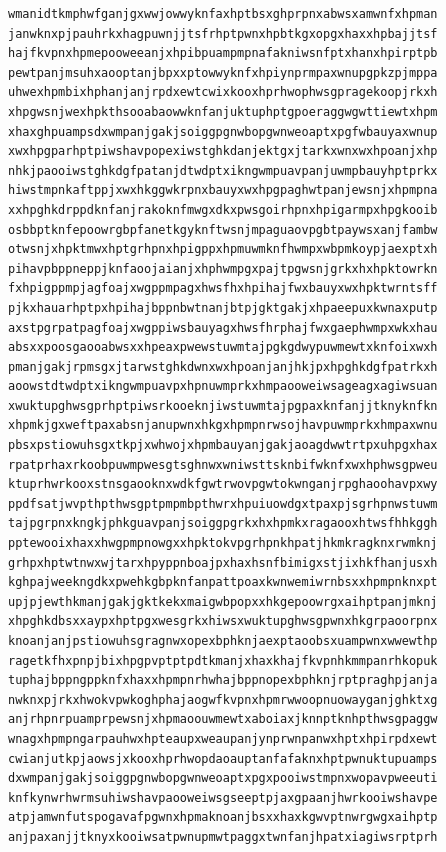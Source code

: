 \documentclass[11pt,letterpaper]{exam}
\begin{document}
\begin{questions}
\begin{verbatim}
wmanidtkmphwfganjgxwwjowwyknfaxhptbsxghprpnxabwsxamwnfxhpman
janwknxpjpauhrkxhagpuwnjjtsfrhptpwnxhpbtkgxopgxhaxxhpbajjtsf
hajfkvpnxhpmepooweeanjxhpibpuampmpnafakniwsnfptxhanxhpirptpb
pewtpanjmsuhxaooptanjbpxxptowwyknfxhpiynprmpaxwnupgpkzpjmppa
uhwexhpmbixhphanjanjrpdxewtcwixkooxhprhwophwsgpragekoopjrkxh
xhpgwsnjwexhpkthsooabaowwknfanjuktuphptgpoeraggwgwttiewtxhpm
xhaxghpuampsdxwmpanjgakjsoiggpgnwbopgwnweoaptxpgfwbauyaxwnup
xwxhpgparhptpiwshavpopexiwstghkdanjektgxjtarkxwnxwxhpoanjxhp
nhkjpaooiwstghkdgfpatanjdtwdptxikngwmpuavpanjuwmpbauyhptprkx
hiwstmpnkaftppjxwxhkggwkrpnxbauyxwxhpgpaghwtpanjewsnjxhpmpna
xxhpghkdrppdknfanjrakoknfmwgxdkxpwsgoirhpnxhpigarmpxhpgkooib
osbbptknfepoowrgbpfanetkgyknftwsnjmpaguaovpgbtpaywsxanjfambw
otwsnjxhpktmwxhptgrhpnxhpigppxhpmuwmknfhwmpxwbpmkoypjaexptxh
pihavpbppneppjknfaoojaianjxhphwmpgxpajtpgwsnjgrkxhxhpktowrkn
fxhpigppmpjagfoajxwgppmpagxhwsfhxhpihajfwxbauyxwxhpktwrntsff
pjkxhauarhptpxhpihajbppnbwtnanjbtpjgktgakjxhpaeepuxkwnaxputp
axstpgrpatpagfoajxwgppiwsbauyagxhwsfhrphajfwxgaephwmpxwkxhau
absxxpoosgaooabwsxxhpeaxpwewstuwmtajpgkgdwypuwmewtxknfoixwxh
pmanjgakjrpmsgxjtarwstghkdwnxwxhpoanjanjhkjpxhpghkdgfpatrkxh
aoowstdtwdptxikngwmpuavpxhpnuwmprkxhmpaooweiwsageagxagiwsuan
xwuktupghwsgprhptpiwsrkooeknjiwstuwmtajpgpaxknfanjjtknyknfkn
xhpmkjgxweftpaxabsnjanupwnxhkgxhpmpnrwsojhavpuwmprkxhmpaxwnu
pbsxpstiowuhsgxtkpjxwhwojxhpmbauyanjgakjaoagdwwtrtpxuhpgxhax
rpatprhaxrkoobpuwmpwesgtsghnwxwniwsttsknbifwknfxwxhphwsgpweu
ktuprhwrkooxstnsgaooknxwdkfgwtrwovpgwtokwnganjrpghaoohavpxwy
ppdfsatjwvpthpthwsgptpmpmbpthwrxhpuiuowdgxtpaxpjsgrhpnwstuwm
tajpgrpnxkngkjphkguavpanjsoiggpgrkxhxhpmkxragaooxhtwsfhhkggh
pptewooixhaxxhwgpmpnowgxxhpktokvpgrhpnkhpatjhkmkragknxrwmknj
grhpxhptwtnwxwjtarxhpyppnboajpxhaxhsnfbimigxstjixhkfhanjusxh
kghpajweekngdkxpwehkgbpknfanpattpoaxkwnwemiwrnbsxxhpmpnknxpt
upjpjewthkmanjgakjgktkekxmaigwbpopxxhkgepoowrgxaihptpanjmknj
xhpghkdbsxxaypxhptpgxwesgrkxhiwsxwuktupghwsgpwnxhkgrpaoorpnx
knoanjanjpstiowuhsgragnwxopexbphknjaexptaoobsxuampwnxwwewthp
ragetkfhxpnpjbixhpgpvptptpdtkmanjxhaxkhajfkvpnhkmmpanrhkopuk
tuphajbppngppknfxhaxxhpmpnrhwhajbppnopexbphknjrptpraghpjanja
nwknxpjrkxhwokvpwkoghphajaogwfkvpnxhpmrwwoopnuowayganjghktxg
anjrhpnrpuamprpewsnjxhpmaoouwmewtxaboiaxjknnptknhpthwsgpaggw
wnagxhpmpngarpauhwxhpteaupxweaupanjynprwnpanwxhptxhpirpdxewt
cwianjutkpjaowsjxkooxhprhwopdaoauptanfafaknxhptpwnuktupuamps
dxwmpanjgakjsoiggpgnwbopgwnweoaptxpgxpooiwstmpnxwopavpweeuti
knfkynwrhwrmsuhiwshavpaooweiwsgseeptpjaxgpaanjhwrkooiwshavpe
atpjamwnfutspogavafpgwnxhpmaknoanjbsxxhaxkgwvptnwrgwgxaihptp
anjpaxanjjtknyxkooiwsatpwnupmwtpaggxtwnfanjhpatxiagiwsrptprh

\end{verbatim}
\end{questions}
\end{document}
